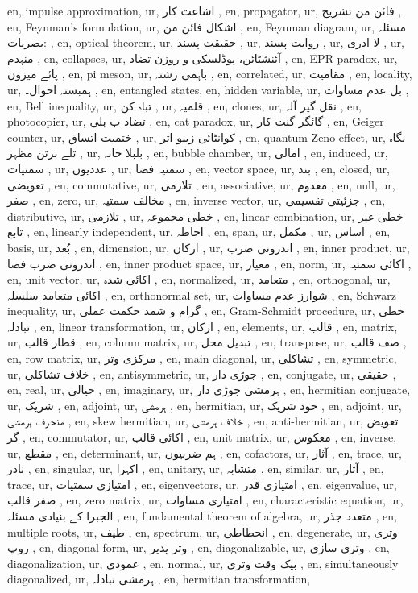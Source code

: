 en, impulse approximation,
ur, اشاعت کار ,
en, propagator,
ur,  فائن من تشریح ,
en, Feynman's formulation,
ur, اشکال فائن من ,
en, Feynman diagram,
ur, مسئلہ بصریات: ,
en, optical theorem,
ur, حقیقت پسند ,
ur, روایت پسند  ,
ur, لا ادری ,
ur,  منہدم ,
en, collapses,
ur, آئنشٹائن، پوڈلسکی و روزن تضاد ,
en, EPR paradox,
ur, پائے میزون ,
en, pi meson,
ur, باہمی رشتہ ,
en, correlated,
ur,  مقامیت ,
en, locality,
ur, ہمبستہ احوال۔ ,
en, entangled states,
en, hidden variable,
ur,  بل عدم مساوات ,
en, Bell inequality,
ur,  تباہ کن ,
ur, قلمیہ ,
en, clones,
ur,  نقل گیر آلہ ,
en, photocopier,
ur,  تضاد ب بلی ,
en, cat paradox,
ur,  گائگر گنت کار ,
en, Geiger counter,
ur, ختمیت اتساق ,
ur, کوانٹائی زینو اثر ,
en, quantum Zeno effect,
ur, نگاہ تلے برتن مظہر ,
ur, بلبلا خانہ ,
en, bubble chamber,
ur, امالی ,
en, induced,
ur,  سمتیات ,
ur, عددیوں ,
ur, سمتیہ فضا ,
en, vector space,
ur,  بند ,
en, closed,
ur, تعویضی ,
en, commutative,
ur, تلازمی ,
en, associative,
ur,  معدوم ,
en, null,
ur, صفر ,
en, zero,
ur, مخالف سمتیہ ,
en, inverse vector,
ur,  جزئیتی تقسیمی ,
en, distributive,
ur, تلازمی ,
ur, خطی مجموعہ ,
en, linear combination,
ur, خطی غیر تابع ,
en, linearly independent,
ur, احاطہ ,
en, span,
ur, مکمل ,
ur, اساس ,
en, basis,
ur, بُعد ,
en, dimension,
ur,  ارکان ,
ur,  اندرونی ضرب ,
en, inner product,
ur, اندرونی ضرب فضا ,
en, inner product space,
ur, معیار ,
en, norm,
ur,  اکائی سمتیہ ,
en, unit vector,
ur, اکائی شدہ ,
en, normalized,
ur, متعامد ,
en, orthogonal,
ur,  اکائی متعامد سلسلہ ,
en, orthonormal set,
ur, شوارز عدم مساوات ,
en, Schwarz inequality,
ur, گرام و شمد حکمت عملی ,
en, Gram-Schmidt procedure,
ur, خطی تبادلہ ,
en, linear transformation,
ur,  ارکان ,
en, elements,
ur, قالب ,
en, matrix,
ur, قطار قالب ,
en, column matrix,
ur, تبدیل محل ,
en, transpose,
ur,  صف قالب ,
en, row matrix,
ur, مرکزی وتر ,
en, main diagonal,
ur, تشاکلی ,
en, symmetric,
ur, خلاف تشاکلی ,
en, antisymmetric,
ur, جوڑی دار ,
en, conjugate,
ur,  حقیقی ,
en, real,
ur,  خیالی ,
en, imaginary,
ur, ہرمشی جوڑی دار ,
en, hermitian conjugate,
ur, شریک ,
en, adjoint,
ur,  ہرمشی  ,
en, hermitian,
ur, خود شریک ,
en, adjoint,
ur,  منحرف ہرمشی ,
en, skew hermitian,
ur, خلاف ہرمشی ,
en, anti-hermitian,
ur, تعویض گر ,
en, commutator,
ur, اکائی قالب ,
en, unit matrix,
ur, معکوس ,
en, inverse,
ur, مقطع ,
en, determinant,
ur, ہم ضربیوں ,
en, cofactors,
ur, آثار ,
en, trace,
ur, نادر ,
en, singular,
ur, اکہرا ,
en, unitary,
ur, متشابہ ,
en, similar,
ur, آثار ,
en, trace,
ur, امتیازی سمتیات ,
en, eigenvectors,
ur, امتیازی قدر ,
en, eigenvalue,
ur,  صفر قالب ,
en, zero matrix,
ur, امتیازی مساوات ,
en, characteristic equation,
ur, الجبرا کے بنیادی مسئلہ ,
en, fundamental theorem of algebra,
ur, متعدد جذر ,
en, multiple roots,
ur, طیف ,
en, spectrum,
ur, انحطاطی ,
en, degenerate,
ur, وتری روپ ,
en, diagonal form,
ur, وتر پذیر ,
en, diagonalizable,
ur, وتری سازی ,
en, diagonalization,
ur, عمودی ,
en, normal,
ur,  بیک وقت وتری ,
en, simultaneously diagonalized,
ur, ہرمشی تبادلہ ,
en, hermitian transformation,
